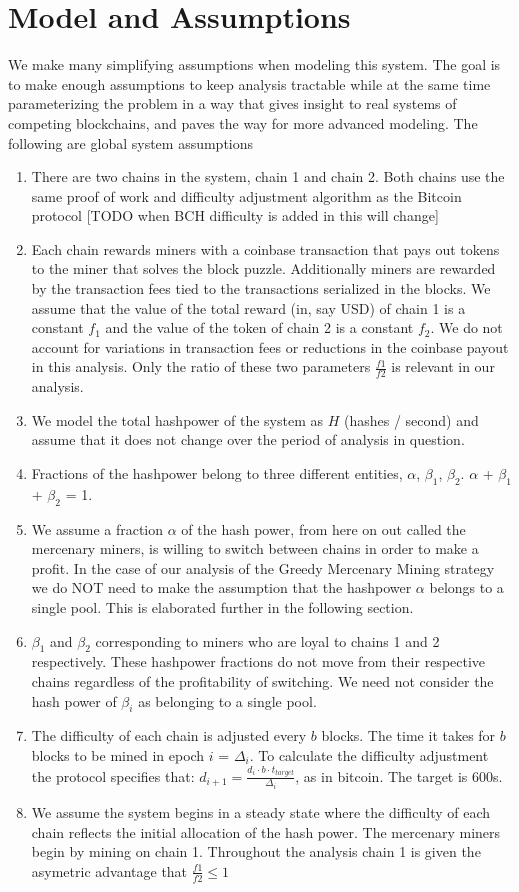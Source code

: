 \documentclass[12pt, preprint]{aastex}
\begin{document}
\section*{Model and Assumptions}
We make many simplifying assumptions when modeling this system.  The goal is to make enough assumptions to keep analysis tractable while at the same time parameterizing the problem in a way that gives insight to real systems of competing blockchains, and paves the way for more advanced modeling.  The following are global system assumptions 
\begin{enumerate}
\item
There are two chains in the system, chain 1 and chain 2.  Both chains use the same proof of work and difficulty adjustment algorithm as the Bitcoin protocol [TODO when BCH difficulty is added in this will change]
\item
Each chain rewards miners with a coinbase transaction that pays out tokens to the miner that solves the block puzzle.  Additionally miners are rewarded by the transaction fees tied to the transactions serialized in the blocks.  We assume that the value of the total reward (in, say USD) of chain 1 is a constant $f_1$ and the value of the token of chain 2 is a constant $f_2$.  We do not account for variations in transaction fees or reductions in the coinbase payout in this analysis.  Only the ratio of these two parameters $\frac{f1}{f2}$ is relevant in our analysis.
\item
We model the total hashpower of the system as $H$ (hashes / second) and assume that it does not change over the period of analysis in question.  
\item
Fractions of the hashpower belong to three different entities, $\alpha$, $\beta_1$, $\beta_2$.  $\alpha$ + $\beta_1$ + $\beta_2$ = 1.
\item
We assume a fraction $\alpha$ of the hash power, from here on out called the mercenary miners, is willing to switch between chains in order to make a profit.  In the case of our analysis of the Greedy Mercenary Mining strategy we do NOT need to make the assumption that the hashpower $\alpha$ belongs to a single pool.  This is elaborated further in the following section.
\item
$\beta_1$ and $\beta_2$ corresponding to miners who are loyal to chains 1 and 2 respectively.  These hashpower fractions do not move from their respective chains regardless of the profitability of switching.  We need not consider the hash power of $\beta_i$ as belonging to a single pool.
\item
The difficulty of each chain is adjusted every $b$ blocks.  The time it takes for $b$ blocks to be mined in epoch $i$ = $\Delta_i$.  To calculate the difficulty adjustment the protocol specifies that: $d_{i+1} = \frac{ d_i \cdot b \cdot t_{target} }{ \Delta_i}$, as in bitcoin.  The target is 600s.

\item
We assume the system begins in a steady state where the difficulty of each chain reflects the initial allocation of the hash power.  The mercenary miners begin by mining on chain 1.  Throughout the analysis chain 1 is given the asymetric advantage that $\frac{f1}{f2} \leq 1$
\end{enumerate}
\end{document}
